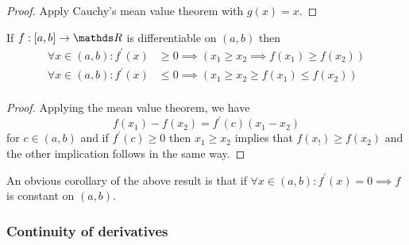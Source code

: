 \begin{proof}
Apply Cauchy's mean value theorem with $g\left(x\right)=x$.
\end{proof}
\begin{prop}
\label{prop:derivativeAndMonotonicity}If $f:\left[a,b\right]\to\R$
is differentiable on $\left(a,b\right)$ then
\begin{align*}
\forall x\in\left(a,b\right):f^{\prime}\left(x\right) & \geq0\implies\left(x_{1}\geq x_{2}\implies f\left(x_{1}\right)\geq f\left(x_{2}\right)\right)\\
\forall x\in\left(a,b\right):f^{\prime}\left(x\right) & \leq0\implies\left(x_{1}\geq x_{2}\geq f\left(x_{1}\right)\leq f\left(x_{2}\right)\right)\\
\end{align*}
\end{prop}

\begin{proof}
Applying the mean value theorem, we have 
\[
f\left(x_{1}\right)-f\left(x_{2}\right)=f^{\prime}\left(c\right)\left(x_{1}-x_{2}\right)
\]
for $c\in\left(a,b\right)$ and if $f^{\prime}\left(c\right)\geq0$
then $x_{1}\geq x_{2}$ implies that $f\left(x_{!}\right)\geq f\left(x_{2}\right)$
and the other implication follows in the same way.
\end{proof}
\begin{rem*}
An obvious corollary of the above result is that if $\forall x\in\left(a,b\right)$$:f^{\prime}\left(x\right)=0\implies f$
is constant on $\left(a,b\right)$.
\end{rem*}

\subsubsection{Continuity of derivatives}

